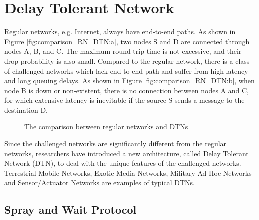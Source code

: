 \section{ Delay Tolerant Network}

\noindent Regular networks, e.g. Internet, always have end-to-end paths. As shown in Figure \ref{fig:comparison_RN_DTN:a}, two nodes S and D are connected through nodes A, B, and C. The maximum round-trip time is not excessive, and their drop probability is also small. Compared to the regular network, there is a class of challenged networks \cite {C1} which lack end-to-end path and suffer from high latency and long queuing delays. As shown in Figure \ref{fig:comparison_RN_DTN:b}, when node B is down or non-existent, there is no connection between nodes A and C, for which extensive latency is inevitable if the source S sends a message to the destination D.

\begin{figure} [H]
  \centering 
  \hspace{1in} 
  \caption{The comparison between regular networks and DTNs} 
  \label{fig:comparison_RN_DTN} %
\end{figure}

Since the challenged networks are significantly different from the regular networks, researchers have introduced a new architecture, called Delay Tolerant Network (DTN), to deal with the unique features of the challenged networks. Terrestrial Mobile Networks, Exotic Media Networks, Military Ad-Hoc Networks and Sensor/Actuator Networks are examples of typical DTNs.


\subsection{ Spray and Wait Protocol}

